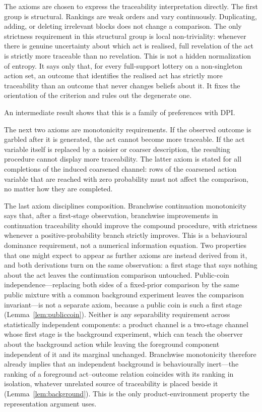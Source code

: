 \documentclass[11pt,a4paper]{article}
\theoremstyle{definition}
\newcommand{\1}{\mathbf 1}
\begin{document}
The axioms are chosen to express the traceability interpretation directly.  The first group is structural.  Rankings are weak orders and vary continuously.  Duplicating, adding, or deleting irrelevant blocks does not change a comparison.  The only strictness requirement in this structural group is local non-triviality: whenever there is genuine uncertainty about which act is realised, full revelation of the act is strictly more traceable than no revelation.  This is not a hidden normalization of entropy.  It says only that, for every full-support lottery on a non-singleton action set, an outcome that identifies the realised act has strictly more traceability than an outcome that never changes beliefs about it.  It
fixes the orientation of the criterion and rules out the degenerate one.

An intermediate result shows that this is a family of preferences with DPI.

The next two axioms are monotonicity requirements.  If the observed outcome is garbled after it is generated, the act
cannot become more traceable.  If the act variable itself is replaced by a noisier or coarser description, the resulting
procedure cannot display more traceability.  The latter axiom is stated for all completions of the induced coarsened
channel: rows of the coarsened action variable that are reached with zero probability must not affect the comparison, no
matter how they are completed.

The last axiom disciplines composition.  Branchwise
continuation monotonicity says that, after a first-stage observation, branchwise improvements in continuation traceability
should improve the compound procedure, with strictness whenever a positive-probability branch strictly improves.  This is a
behavioural dominance requirement, not a numerical information equation.  Two properties that one might expect to appear
as further axioms are instead derived from it, and both derivations turn on the same observation: a first stage that says
nothing about the act leaves the continuation comparison untouched.  Public-coin
independence---replacing both sides of a fixed-prior comparison by the same public mixture with a common background
experiment leaves the comparison invariant---is not a separate axiom, because a public coin is such a first stage
(Lemma~\ref{lem:publiccoin}).  Neither is any separability requirement across statistically independent components: a
product channel is a two-stage channel whose first stage is the background experiment, which can teach the observer about
the background action while leaving the foreground component independent of it and its marginal unchanged.  Branchwise
monotonicity therefore already implies that an independent background is behaviourally inert---the ranking of a
foreground act--outcome relation coincides with its ranking in isolation, whatever unrelated source of traceability is
placed beside it (Lemma~\ref{lem:background}).  This is the only product-environment property the representation argument
uses.
\end{document}
